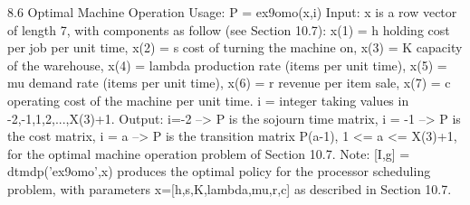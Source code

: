 8.6 Optimal Machine Operation 
Usage:  P = ex9omo(x,i)
Input: x is a row vector of length 7, with components as follow (see Section 10.7): 
x(1) = h  holding  cost per job per unit time,
x(2) = s cost of turning the machine on,
x(3) = K capacity of the warehouse,
x(4) = lambda production rate (items per unit time),
x(5) = mu demand rate (items per unit time),
x(6) = r revenue per item sale,
x(7) = c operating cost of the machine per unit time.
i =  integer taking values in {-2,-1,1,2,...,X(3)+1}.
Output: i=-2 --> P is the sojourn time matrix,
i = -1 --> P  is the cost matrix, 
i = a --> P is the transition matrix P(a-1), 1 <= a <= X(3)+1,
for the optimal machine operation   problem of Section 10.7.
Note:  [I,g] = dtmdp('ex9omo',x) produces the optimal policy for the processor scheduling problem, with parameters x=[h,s,K,lambda,mu,r,c] as described in Section 10.7.  


